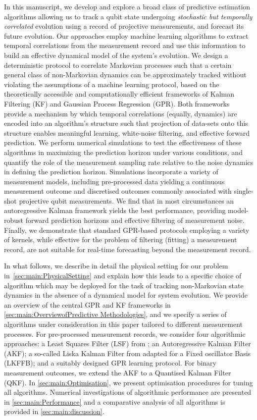 In this manuscript, we develop and explore a broad class of predictive estimation algorithms allowing us to track a qubit state undergoing \emph{stochastic but temporally correlated} evolution using a record of projective measurements, and forecast its future evolution. Our approaches employ machine learning algorithms to extract temporal correlations from the measurement record and use this information to build an effective dynamical model of the system's evolution.  We design a deterministic protocol to correlate Markovian processes such that a certain general class of non-Markovian dynamics can be approximately tracked without violating the assumptions of a machine learning protocol, based on the theoretically accessible and computationally efficient frameworks of Kalman Filtering (KF) and Gaussian Process Regression (GPR).  Both frameworks provide a mechanism by which temporal correlations (equally, dynamics) are encoded into an algorithm's structure such that projection of data-sets onto this structure enables meaningful learning, white-noise filtering, and effective forward prediction.  We perform numerical simulations to test the effectiveness of these algorithms in maximizing the prediction horizon under various conditions, and quantify the role of the measurement sampling rate relative to the noise dynamics in defining the prediction horizon.  Simulations incorporate a variety of measurement models, including pre-processed data yielding a continuous measurement outcome and discretised outcomes commonly associated with single-shot projective qubit measurements.   We find that in most circumstances an autoregressive Kalman framework yields the best performance, providing model-robust forward prediction horizons and effective filtering of measurement noise.  Finally, we demonstrate that standard GPR-based protocols employing a variety of kernels, while effective for the problem of filtering (fitting) a measurement record, are not suitable for real-time forecasting beyond the measurement record.  

In what follows, we describe in detail the physical setting for our problem in~\cref{sec:main:PhysicalSetting} and explain how this leads to a specific choice of algorithm which may be deployed for the task of tracking non-Markovian state dynamics in the absence of a dynamical model for system evolution.  We provide an overview of the central GPR and KF frameworks in \cref{sec:main:OverviewofPredictive Methodologies}, and we specify a series of algorithms under consideration in this paper tailored to different measurement processes. For pre-processed measurement records, we consider four algorithmic approaches: a Least Squares Filter (LSF) from \cite{mavadia2017}; an Autoregressive Kalman Filter (AKF); a so-called Liska Kalman Filter from \cite{livska2007} adapted for a Fixed oscillator Basis (LKFFB); and a suitably designed GPR learning protocol. For binary measurement outcomes, we extend the AKF to a Quantised Kalman Filter (QKF). In \cref{sec:main:Optimisation}, we present optimisation procedures for tuning all algorithms. Numerical investigations of algorithmic performance are presented in \cref{sec:main:Performance} and a comparative analysis of all algorithms is provided in \cref{sec:main:discussion}. 


